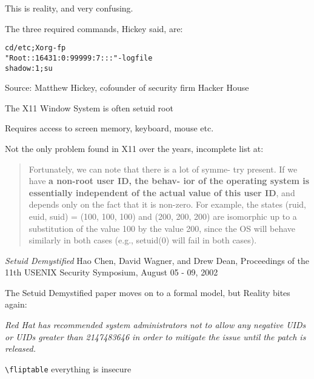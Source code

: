 \documentclass[Screen16to9,17pt]{foils}
\begin{document}
This is reality, and very confusing.


The three required commands, Hickey said, are:
\begin{alltt}
cd /etc; Xorg -fp
"Root::16431:0:99999:7:::" -logfile
shadow  :1;su
\end{alltt}
Source: Matthew Hickey, cofounder of security firm Hacker House

\begin{list2}
\item The X11 Window System is often setuid root
\item Requires access to screen memory, keyboard, mouse etc.
\item Not the only problem found in X11 over the years, incomplete list at:\\
\end{list2}


\begin{quote}
Fortunately, we can note that there is a lot of symme-
try present. If we have {\bf a non-root user ID, the behav-
ior of the operating system is essentially independent
of the actual value of this user ID}, and depends only
on the fact that it is non-zero. For example, the states
(ruid, euid, suid) = (100, 100, 100) and (200, 200, 200)
are isomorphic up to a substitution of the value 100 by
the value 200, since the OS will behave similarly in both
cases (e.g., setuid(0) will fail in both cases).
\end{quote}
\emph{Setuid Demystified} Hao Chen, David Wagner, and Drew Dean,
Proceedings of the 11th USENIX Security Symposium,
August 05 - 09, 2002

\begin{list2}
\item The Setuid Demystified paper moves on to a formal model,
but Reality bites again:\\
\item \emph{Red Hat has recommended system administrators not to allow any negative UIDs or UIDs greater than 2147483646 in order to mitigate the issue until the patch is released.}
\item \verb+\fliptable+ everything is insecure
\end{list2}
\end{document}
